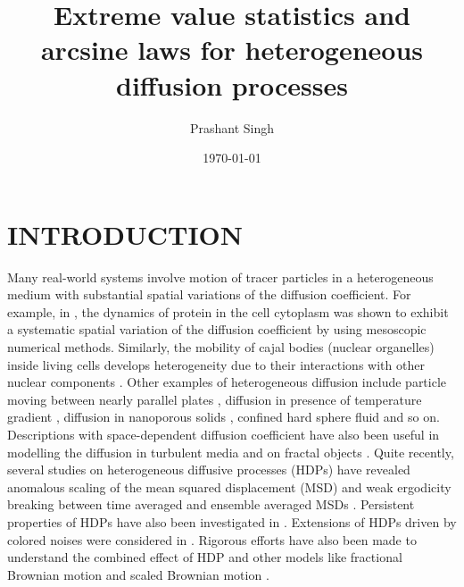 \documentclass[showpacs,amsmath,amssymb,aps,pre,twocolumn,]{revtex4-1}
\def\greenw#1{{\color{black} #1}}
\def\bluew#1{{\color{black} #1}}
\begin{document}

\title{Extreme value statistics and arcsine laws for heterogeneous diffusion processes}
\author{Prashant Singh}


\date{\today}

\maketitle
\section{INTRODUCTION}
Many real-world systems involve motion of tracer particles in a heterogeneous medium with substantial spatial variations of the diffusion coefficient. For example, in \bluew{\cite{Kuhn2011, English2011}}, the dynamics of protein in the cell cytoplasm was shown to exhibit a systematic spatial variation of the diffusion coefficient by using mesoscopic numerical methods. Similarly, the mobility of cajal bodies (nuclear organelles) inside living cells develops heterogeneity due to their interactions with other nuclear components \bluew{\cite{Platani2002}}. Other examples of heterogeneous diffusion include particle moving between nearly parallel plates \bluew{\cite{Lancon2001}}, diffusion in presence of temperature gradient \bluew{\cite{Yanga2012}}, diffusion in nanoporous solids \bluew{\cite{Maris2021}}, confined hard sphere fluid \bluew{\cite{Mittal2008}} and so on. Descriptions with space-dependent diffusion coefficient have also been useful in modelling the diffusion in turbulent media \bluew{\cite{Richardson1926}} and on fractal objects \bluew{\cite{Shaughnessy1985}}. Quite recently, several studies on heterogeneous diffusive processes (HDPs) have revealed anomalous scaling of the mean squared displacement (MSD) and weak ergodicity breaking between time averaged and ensemble averaged MSDs \bluew{\cite{Cherstvy2013, Cherstvy2014, Leibovich2019,Cherstvy2015, Wang2019, Fa2005, new2}}. Persistent properties of HDPs have also been investigated in \bluew{\cite{Singh2020}}. Extensions of HDPs driven by colored noises were considered in \cite{MutothyaXu2021,Mutothya2021,Xu2020}. \greenw{Rigorous efforts have also been made to understand the combined effect of HDP and other models like fractional Brownian motion \cite{new1} and scaled Brownian motion \cite{Rnew1}}.
\end{document}
